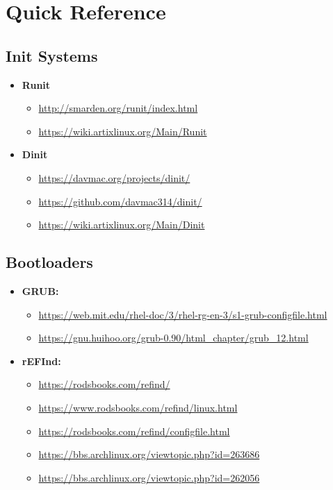 \documentclass[10pt, a4paper, onecolumn, oneside, titlepage, openany]{book}
\begin{document}
\chapter{Quick Reference}
\section{Init Systems}
\begin{itemize}
    \item \textbf{Runit}
    \begin{itemize}
        \item \url{http://smarden.org/runit/index.html}
        \item \url{https://wiki.artixlinux.org/Main/Runit}
    \end{itemize}
    \item \textbf{Dinit}
    \begin{itemize}
        \item \url{https://davmac.org/projects/dinit/}
        \item \url{https://github.com/davmac314/dinit/}
        \item \url{https://wiki.artixlinux.org/Main/Dinit}
    \end{itemize}
\end{itemize}

\section{Bootloaders}
\begin{itemize}
    \item \textbf{GRUB:}
    \begin{itemize}
        \item \url{https://web.mit.edu/rhel-doc/3/rhel-rg-en-3/s1-grub-configfile.html}
        \item \url{https://gnu.huihoo.org/grub-0.90/html_chapter/grub_12.html}
    \end{itemize}
    \item \textbf{rEFInd:}
    \begin{itemize}
        \item \url{https://rodsbooks.com/refind/}
        \item \url{https://www.rodsbooks.com/refind/linux.html}
        \item \url{https://rodsbooks.com/refind/configfile.html}
        \item \url{https://bbs.archlinux.org/viewtopic.php?id=263686}
        \item \url{https://bbs.archlinux.org/viewtopic.php?id=262056}
    \end{itemize}
\end{itemize}
\end{document}
